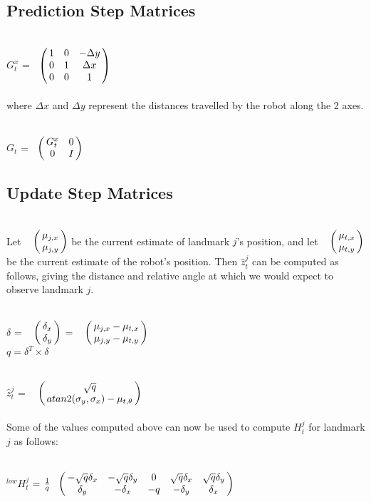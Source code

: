 \documentclass{ba-kecs}
\numberwithin{figure}{section}
\numberwithin{equation}{section}
\begin{document}
\subsection{Prediction Step Matrices}
$G_t^x$ = 
$\bordermatrix{ 	& \cr
                 &1 & 0 & -\Delta y \cr
                 &0 & 1 & \Delta x \cr
                 &0 & 0 & 1 \cr}$ \\ \\
where $\Delta x$ and $\Delta y$ represent the distances travelled by the robot along the 2 axes.

$G_t$ = 
$\bordermatrix{ 	& \cr
                 &G_t^x & 0 \cr
                 &0 & I \cr}$
                 
\subsection{Update Step Matrices}
Let $\bordermatrix{~ \cr
                        & \mu_{j,x} \cr
                        & \mu_{j,y}}$
be the current estimate of landmark $j$'s position, and let $\bordermatrix{~ \cr
                        & \mu_{t,x} \cr
                        & \mu_{t,y}}$
be the current estimate of the robot's position. Then $\hat{z}^j_t$ can be computed as follows, giving the distance and relative angle at which we would expect to observe landmark $j$.
                        
$\delta$ = $\bordermatrix{~ \cr
                        & \delta_{x} \cr
                        & \delta_{y}}$ = $\bordermatrix{~ \cr
                                                                                                & \mu_{j,x} - \mu_{t,x} \cr
                                                                & \mu_{j,y} - \mu_{t,y} \cr}$ \\

$q = \delta^{T} \times \delta$

$\hat{z}^{j}_{t}$ = $\bordermatrix{~ \cr
                        & \sqrt{q} \cr
                        & atan2(\sigma_{y},\sigma_{x}) - \mu_{t,\theta}}$ \\ \\
Some of the values computed above can now be used to compute $H^{j}_{t}$ for landmark $j$ as follows:
                                                  
$^{low}H^{j}_{t}$ = $\frac{1}{q} \bordermatrix{~ \cr
                                & -\sqrt{q} \delta_{x} & -\sqrt{q} \delta_{y} & 0 & \sqrt{q} \delta_{x} & \sqrt{q} \delta_{y} \cr
                                & \delta_{y} & -\delta_{x} & -q & -\delta_{y} & \delta_{x}} $\\
                                
\end{document}
